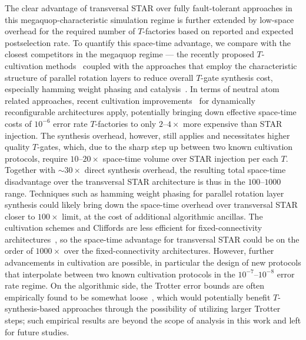 \documentclass[aps, prx, reprint, superscriptaddress, longbibliography, floatfix]{revtex4-2}
\begin{document}
 The clear advantage of transversal STAR over fully fault-tolerant approaches in this megaquop-characteristic simulation regime is further extended by low-space overhead for the required number of $T$-factories based on reported and expected postselection rate. To quantify this space-time advantage, we compare with the closest competitors in the megaquop regime --- the recently proposed $T$-cultivation methods~\cite{Gidney2024, Chen2025} coupled with the approaches that employ the characteristic structure of parallel rotation layers to reduce overall $T$-gate synthesis cost, especially hamming weight phasing and catalysis~\cite{Gidney2018, Kivlichan2018, Kan2024}. In terms of neutral atom related approaches, recent cultivation improvements~\cite{Chen2025} for dynamically reconfigurable architectures apply, potentially bringing down effective space-time costs of $10^{-6}$ error rate $T$-factories to only $2\text{--}4\times$ more expensive than STAR injection. The synthesis overhead, however, still applies and necessitates higher quality $T$-gates, which, due to the sharp step up between two known cultivation protocols, require $10\text{--}20\times$ space-time volume over STAR injection per each $T$. Together with $\sim 30\times$ direct synthesis overhead, the resulting total space-time disadvantage over the transversal STAR architecture is thus in the $100\text{--}1000$ range. Techniques such as hamming weight phasing for parallel rotation layer synthesis could likely bring down the space-time overhead over transversal STAR closer to $100\times$ limit, at the cost of additional algorithmic ancillas. The cultivation schemes and Cliffords are less efficient for fixed-connectivity architectures~\cite{Gidney2018}, so the space-time advantage for transversal STAR could be on the order of $1000\times$ over the fixed-connectivity architectures. However, further advancements in cultivation are possible, in particular the design of new protocols that interpolate between two known cultivation protocols in the $10^{-7}$--$10^{-8}$ error rate regime. On the algorithmic side, the Trotter error bounds are often empirically found to be somewhat loose~\cite{Childs2018, Martinez-Martinez2024}, which would potentially benefit $T$-synthesis-based approaches through the possibility of utilizing larger Trotter steps; such empirical results are beyond the scope of analysis in this work and left for future studies.
\end{document}
